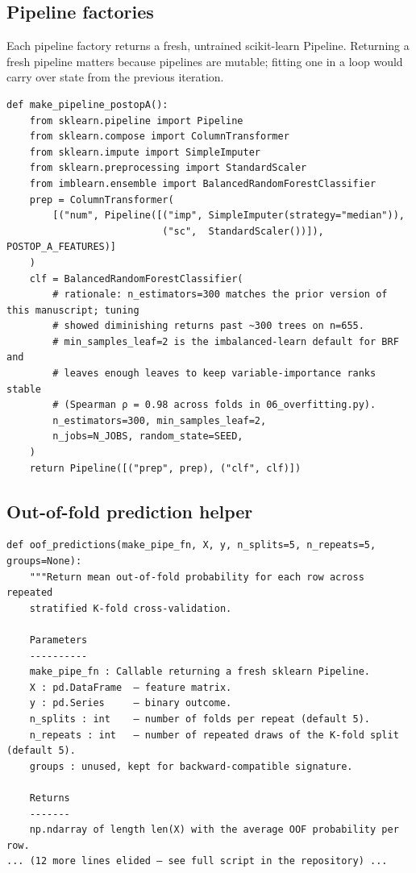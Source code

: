 \documentclass[11pt,a4paper]{article}
\begin{document}
\subsection{Pipeline factories}
Each pipeline factory returns a fresh, untrained scikit-learn Pipeline. Returning a fresh pipeline matters because pipelines are mutable; fitting one in a loop would carry over state from the previous iteration.

\begin{lstlisting}[style=codeblock]
def make_pipeline_postopA():
    from sklearn.pipeline import Pipeline
    from sklearn.compose import ColumnTransformer
    from sklearn.impute import SimpleImputer
    from sklearn.preprocessing import StandardScaler
    from imblearn.ensemble import BalancedRandomForestClassifier
    prep = ColumnTransformer(
        [("num", Pipeline([("imp", SimpleImputer(strategy="median")),
                           ("sc",  StandardScaler())]), POSTOP_A_FEATURES)]
    )
    clf = BalancedRandomForestClassifier(
        # rationale: n_estimators=300 matches the prior version of this manuscript; tuning
        # showed diminishing returns past ~300 trees on n=655.
        # min_samples_leaf=2 is the imbalanced-learn default for BRF and
        # leaves enough leaves to keep variable-importance ranks stable
        # (Spearman ρ = 0.98 across folds in 06_overfitting.py).
        n_estimators=300, min_samples_leaf=2,
        n_jobs=N_JOBS, random_state=SEED,
    )
    return Pipeline([("prep", prep), ("clf", clf)])
\end{lstlisting}

\subsection{Out-of-fold prediction helper}

\begin{lstlisting}[style=codeblock]
def oof_predictions(make_pipe_fn, X, y, n_splits=5, n_repeats=5, groups=None):
    """Return mean out-of-fold probability for each row across repeated
    stratified K-fold cross-validation.

    Parameters
    ----------
    make_pipe_fn : Callable returning a fresh sklearn Pipeline.
    X : pd.DataFrame  — feature matrix.
    y : pd.Series     — binary outcome.
    n_splits : int    — number of folds per repeat (default 5).
    n_repeats : int   — number of repeated draws of the K-fold split (default 5).
    groups : unused, kept for backward-compatible signature.

    Returns
    -------
    np.ndarray of length len(X) with the average OOF probability per row.
... (12 more lines elided — see full script in the repository) ...
\end{lstlisting}
\end{document}
